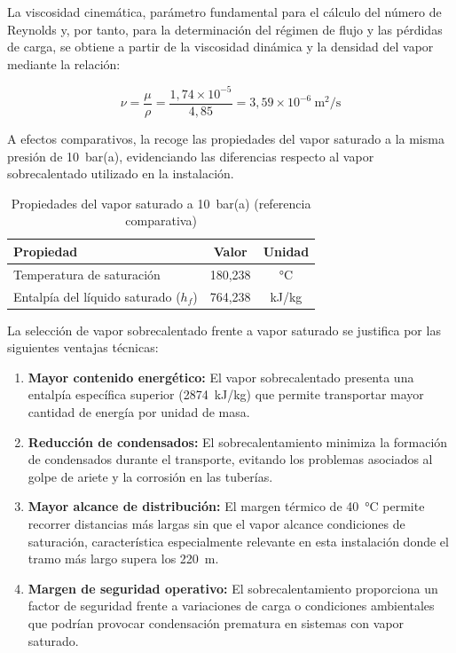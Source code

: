 \documentclass[12pt]{article}
\begin{document}
La viscosidad cinemática, parámetro fundamental para el cálculo del número de Reynolds y, por tanto, para la determinación del régimen de flujo y las pérdidas de carga, se obtiene a partir de la viscosidad dinámica y la densidad del vapor mediante la relación:

\begin{equation}
	\nu = \frac{\mu}{\rho} = \frac{1{,}74 \times 10^{-5}}{4{,}85} = 3{,}59 \times 10^{-6} \ \text{m}^2\text{/s}
	\label{eq:viscosidad-cinematica}
\end{equation}

A efectos comparativos, la  recoge las propiedades del vapor saturado a la misma presión de 10~bar(a), evidenciando las diferencias respecto al vapor sobrecalentado utilizado en la instalación.

\begin{table}[H]
	\centering
	\caption{Propiedades del vapor saturado a 10~bar(a) (referencia comparativa)}
	\label{tab:comparacion-vapor-saturado}
	\begin{tabular}{lcc}
		\toprule
		\textbf{Propiedad}                    & \textbf{Valor} & \textbf{Unidad} \\
		\midrule
		Temperatura de saturación             & 180,238        & °C              \\
		Entalpía del líquido saturado ($h_f$) & 764,238        & kJ/kg           \\
		\bottomrule
	\end{tabular}
\end{table}

La selección de vapor sobrecalentado frente a vapor saturado se justifica por las siguientes ventajas técnicas:

\begin{enumerate}[label=\arabic*., leftmargin=2em]
	\item \textbf{Mayor contenido energético:} El vapor sobrecalentado presenta una entalpía específica superior (2874~kJ/kg) que permite transportar mayor cantidad de energía por unidad de masa.
	\item \textbf{Reducción de condensados:} El sobrecalentamiento minimiza la formación de condensados durante el transporte, evitando los problemas asociados al golpe de ariete y la corrosión en las tuberías.
	\item \textbf{Mayor alcance de distribución:} El margen térmico de 40~°C permite recorrer distancias más largas sin que el vapor alcance condiciones de saturación, característica especialmente relevante en esta instalación donde el tramo más largo supera los 220~m.
	\item \textbf{Margen de seguridad operativo:} El sobrecalentamiento proporciona un factor de seguridad frente a variaciones de carga o condiciones ambientales que podrían provocar condensación prematura en sistemas con vapor saturado.
\end{enumerate}
\end{document}
